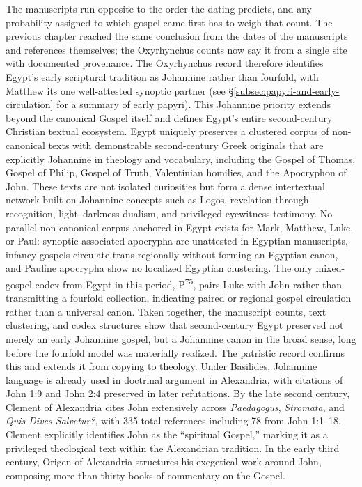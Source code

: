 The manuscripts run opposite to the order the dating predicts, and any probability assigned to which gospel came first has to weigh that count.
The previous chapter reached the same conclusion from the dates of the manuscripts and references themselves; the Oxyrhynchus counts now say it from a single site with documented provenance.
The Oxyrhynchus record therefore identifies Egypt's early scriptural tradition as Johannine rather than fourfold, with Matthew its one well-attested synoptic partner (see §\ref{subsec:papyri-and-early-circulation} for a summary of early papyri).
This Johannine priority extends beyond the canonical Gospel itself and defines Egypt's entire second-century Christian textual ecosystem.
Egypt uniquely preserves a clustered corpus of non-canonical texts with demonstrable second-century Greek originals that are explicitly Johannine in theology and vocabulary, including the Gospel of Thomas, Gospel of Philip, Gospel of Truth, Valentinian homilies, and the Apocryphon of John.
These texts are not isolated curiosities but form a dense intertextual network built on Johannine concepts such as Logos, revelation through recognition, light--darkness dualism, and privileged eyewitness testimony.
No parallel non-canonical corpus anchored in Egypt exists for Mark, Matthew, Luke, or Paul: synoptic-associated apocrypha are unattested in Egyptian manuscripts, infancy gospels circulate trans-regionally without forming an Egyptian canon, and Pauline apocrypha show no localized Egyptian clustering.
The only mixed-gospel codex from Egypt in this period, P\textsuperscript{75}, pairs Luke with John rather than transmitting a fourfold collection, indicating paired or regional gospel circulation rather than a universal canon.
Taken together, the manuscript counts, text clustering, and codex structures show that second-century Egypt preserved not merely an early Johannine gospel, but a Johannine canon in the broad sense, long before the fourfold model was materially realized.
The patristic record confirms this and extends it from copying to theology.
Under Basilides, Johannine language is already used in doctrinal argument in Alexandria, with citations of John 1:9 and John 2:4 preserved in later refutations.
By the late second century, Clement of Alexandria cites John extensively across \emph{Paedagogus}, \emph{Stromata}, and \emph{Quis Dives Salvetur?}, with 335 total references including 78 from John 1:1--18.
Clement explicitly identifies John as the ``spiritual Gospel,'' marking it as a privileged theological text within the Alexandrian tradition.
In the early third century, Origen of Alexandria structures his exegetical work around John, composing more than thirty books of commentary on the Gospel.
